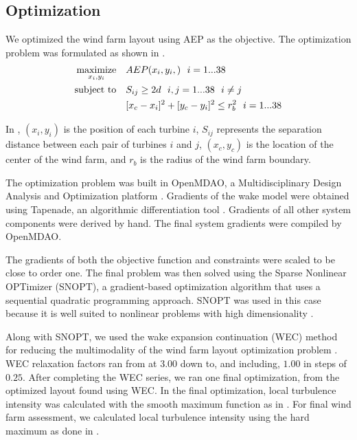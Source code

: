 \documentclass[conf]{new-aiaa}
\begin{document}
\subsection{Optimization}\label{sec:opt}

We optimized the wind farm layout using AEP as the objective. The optimization problem was formulated as shown in .
%
\begin{equation}
	\label{eq:objective}
	\begin{aligned} [b]
	\underset{x_i,y_i}{\textrm{maximize}} \quad & AEP(x_i,y_i,)~~i=1...38\\
	\textrm{subject to} \quad & S_{ij} \geq 2\*d~~i,j=1...38~~i \neq j\\
	 & [x_c-x_i]^2+[y_c-y_i]^2 \leq r_{b}^2~~i=1...38\\
	\end{aligned}
\end{equation}
%
In , $(x_i,y_i)$ is the position of each turbine $i$, $S_{ij}$ represents the separation distance between each pair of turbines $i$ and $j$, $(x_c,y_c)$ is the location of the center of the wind farm, and $r_b$ is the radius of the wind farm boundary.

The optimization problem was built in OpenMDAO, a Multidisciplinary Design Analysis and Optimization platform  \cite{gray2010_OpenMDAO}. Gradients of the wake model were obtained using Tapenade, an algorithmic differentiation tool \cite{tapenade2013}. Gradients of all other system components were derived by hand. The final system gradients were compiled by OpenMDAO.

The gradients of both the objective function and constraints were scaled to be close to order one. The final problem was then solved using the Sparse Nonlinear OPTimizer (SNOPT), a gradient-based optimization algorithm that uses a sequential quadratic programming approach. SNOPT was used in this case because it is well suited to nonlinear problems with high dimensionality \cite{gill2005}. 

Along with SNOPT, we used the wake expansion continuation (WEC) method for reducing the multimodality of the wind farm layout optimization problem \cite{thomas2018-wec}. WEC relaxation factors ran from at $3.00$ down to, and including, $1.00$ in steps of $0.25$.  After completing the WEC series, we ran one final optimization, from the optimized layout found using WEC. In the final optimization, local turbulence intensity was calculated with the smooth maximum function as in . For final wind farm assessment, we calculated local turbulence intensity using the hard maximum as done in \cite{niayifar2016}. 
\end{document}
